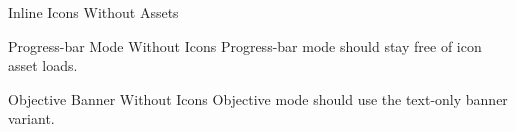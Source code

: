 \documentclass[aspectratio=169]{beamer}
\begin{document}
\begin{frame}{Inline Icons Without Assets}
\end{frame}

\begin{frame}{Progress-bar Mode Without Icons}
  Progress-bar mode should stay free of icon asset loads.
\end{frame}

\begin{frame}{Objective Banner Without Icons}
  Objective mode should use the text-only banner variant.
\end{frame}
\end{document}
